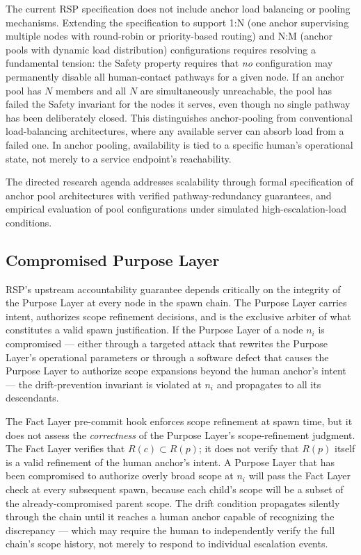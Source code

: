 The current RSP specification does not include anchor load balancing or pooling mechanisms. Extending the specification to support 1:N (one anchor supervising multiple nodes with round-robin or priority-based routing) and N:M (anchor pools with dynamic load distribution) configurations requires resolving a fundamental tension: the Safety property requires that \emph{no} configuration may permanently disable all human-contact pathways for a given node. If an anchor pool has $N$ members and all $N$ are simultaneously unreachable, the pool has failed the Safety invariant for the nodes it serves, even though no single pathway has been deliberately closed. This distinguishes anchor-pooling from conventional load-balancing architectures, where any available server can absorb load from a failed one. In anchor pooling, availability is tied to a specific human's operational state, not merely to a service endpoint's reachability.

The directed research agenda addresses scalability through formal specification of anchor pool architectures with verified pathway-redundancy guarantees, and empirical evaluation of pool configurations under simulated high-escalation-load conditions.

\subsection{Compromised Purpose Layer}\label{sec:rs-limitations:purpose-layer}

RSP's upstream accountability guarantee depends critically on the integrity of the Purpose Layer at every node in the spawn chain. The Purpose Layer carries intent, authorizes scope refinement decisions, and is the exclusive arbiter of what constitutes a valid spawn justification. If the Purpose Layer of a node $n_i$ is compromised — either through a targeted attack that rewrites the Purpose Layer's operational parameters or through a software defect that causes the Purpose Layer to authorize scope expansions beyond the human anchor's intent — the drift-prevention invariant is violated at $n_i$ and propagates to all its descendants.

The Fact Layer pre-commit hook enforces scope refinement at spawn time, but it does not assess the \emph{correctness} of the Purpose Layer's scope-refinement judgment. The Fact Layer verifies that $R(c) \subset R(p)$; it does not verify that $R(p)$ itself is a valid refinement of the human anchor's intent. A Purpose Layer that has been compromised to authorize overly broad scope at $n_i$ will pass the Fact Layer check at every subsequent spawn, because each child's scope will be a subset of the already-compromised parent scope. The drift condition propagates silently through the chain until it reaches a human anchor capable of recognizing the discrepancy — which may require the human to independently verify the full chain's scope history, not merely to respond to individual escalation events.

